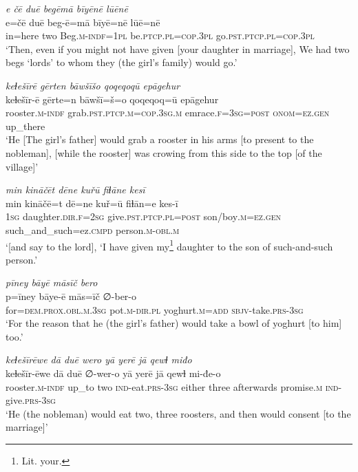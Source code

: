 \ea \label{RE.43}
\textit{e čē duē begēmā bīyēnē lūēnē} \\ 
\gll e=čē duē beg-ē=mā bīyē=nē lūē=nē \\ 
 in=here two Beg\textsc{.m}\textsc{-indf}\textsc{=\textsc{1pl}} be\textsc{.ptcp}\textsc{.pl}\textsc{=cop}\textsc{.3pl} go\textsc{.pst}\textsc{.ptcp}\textsc{.pl}\textsc{=cop}\textsc{.3pl} \\ 
\glt `Then, even if you might not have given [your daughter in marriage], We had two begs ‘lords’ to whom they (the girl's family) would go.'
\z 
 
\ea \label{RE.48}
\textit{keɫešīrē gērten bāwšīšo qoqeqoqū epāgehur} \\ 
\gll keɫešīr-ē gērte=n bāwšī=š=o qoqeqoq=ū epāgehur \\ 
 rooster\textsc{.m}\textsc{-indf} grab\textsc{.pst}\textsc{.ptcp}\textsc{.m}\textsc{=cop}\textsc{.3sg}\textsc{.m} emrace\textsc{.f}\textsc{=3sg}\textsc{=\textsc{post}} \textsc{onom}\textsc{=ez.gen} up\_there \\ 
\glt `He [The girl’s father] would grab a rooster in his arms [to present to the nobleman], [while the rooster] was crowing from this side to the top [of the village]'
\z 
 
\ea \label{RE.49}
\textit{min kināčēt dēne kuřū fiɫāne kesī} \\ 
\gll min kināčē=t dē=ne kuř=ū fiɫān=e kes-ī \\ 
 \textsc{1sg} daughter\textsc{.dir}\textsc{.f}\textsc{=\textsc{2sg}} give\textsc{.pst}\textsc{.ptcp}\textsc{.pl}\textsc{=\textsc{post}} son/boy\textsc{.m}\textsc{=ez.gen} such\_and\_such=ez\textsc{.cmpd} person\textsc{.m}\textsc{-obl}\textsc{.m} \\ 
\glt `[and say to the lord], ‘I have given my\footnote{Lit. your.} daughter to the son of such-and-such person.'
\z 
 
\ea \label{RE.52}
\textit{pīney bāyē māsīč bero} \\ 
\gll p=īney bāye-ē mās=īč ∅-ber-o \\ 
 for=\textsc{dem.prox}\textsc{.obl}\textsc{.m}\textsc{.3sg} pot\textsc{.m}\textsc{-dir}\textsc{.pl} yoghurt\textsc{.m}\textsc{=add} \textsc{sbjv-}take\textsc{.prs}\textsc{-3sg} \\ 
\glt `For the reason that he (the girl’s father) would take a bowl of yoghurt [to him] too.'
\z 
 
\ea \label{RE.54}
\textit{keɫešīrēwe dā duē wero yā yerē jā qewɫ miđo} \\ 
\gll keɫešīr-ēwe dā duē ∅-wer-o yā yerē jā qewɫ mi-đe-o \\ 
 rooster\textsc{.m}\textsc{-indf} up\_to two \textsc{ind-}eat\textsc{.prs}\textsc{-3sg} either three afterwards promise\textsc{.m} \textsc{ind-}give\textsc{.prs}\textsc{-3sg} \\ 
\glt `He (the nobleman) would eat two, three roosters, and then would consent [to the marriage]'
\z 
 

